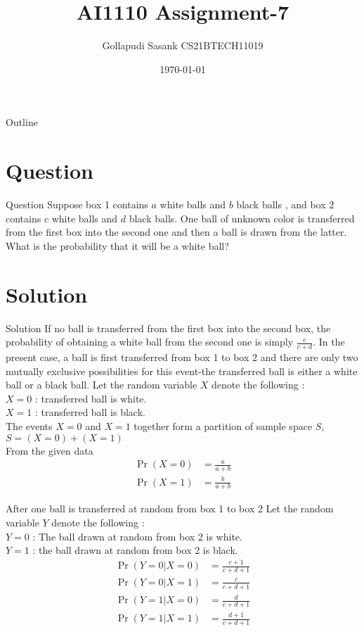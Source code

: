 \documentclass{beamer}
\title{AI1110 Assignment-7}
\author{Gollapudi Sasank CS21BTECH11019}
\date{\today}
\providecommand{\pr}[1]{\ensuremath{\Pr\left(#1\right)}}
\begin{document}
\begin{frame}
    \titlepage 
\end{frame}

\logo{}


\begin{frame}{Outline}
    \tableofcontents
\end{frame}


\section{Question}
\begin{frame}{Question}
Suppose box 1 contains $a$ white balls and $b$ black balls , and box 2 contains $c$ white balls and $d$ black balls.  One ball of unknown color is transferred from the first box into the second one and then a ball is drawn from the latter. What is the probability that it will be a white ball? 
\end{frame}


\section{Solution}
\begin{frame}{Solution}
If no ball is transferred from the first box into the second box, the probability of obtaining a white ball from the second one is simply $\frac{c}{c + d}$. In the present case, a ball is first transferred from box 1 to box 2 and there are only two mutually exclusive possibilities  for this event-the transferred ball is either a white ball or a black ball. Let the random variable $X$ denote the following : \\
$X = 0$ : transferred ball is white. \\
$X = 1$ : transferred ball is black. \\
The events $X=0$ and $X=1$ together form a partition of sample space $S$, $S = (X=0) + (X=1)$ \\
From the given data 
\begin{align}
    \pr{X=0} &= \frac{a}{a+b} \\
    \pr{X=1} &= \frac{b}{a+b} 
\end{align}
\end{frame} 

\begin{frame}
After one ball is transferred at random from box 1 to box 2 Let the random variable $Y$ denote the following : \\
$Y = 0$ : The ball drawn at random from box 2 is white. \\
$Y = 1$ : the ball drawn at random from box 2 is black. \\
\begin{align}
    \pr{Y=0|X=0} &= \frac{c+1}{c+d+1} \\
    \pr{Y=0|X=1} &= \frac{c}{c+d+1} \\
    \pr{Y=1|X=0} &= \frac{d}{c+d+1} \\
    \pr{Y=1|X=1} &= \frac{d+1}{c+d+1} 
\end{align}

\end{frame}
\end{document}
